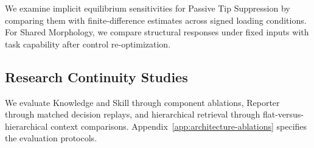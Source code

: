 We examine implicit equilibrium sensitivities for Passive Tip Suppression by comparing them with finite-difference estimates across signed loading conditions. For Shared Morphology, we compare structural responses under fixed inputs with task capability after control re-optimization.

\subsection{Research Continuity Studies}
\label{subsec:setup-continuity}

We evaluate Knowledge and Skill through component ablations, Reporter through matched decision replays, and hierarchical retrieval through flat-versus-hierarchical context comparisons. Appendix~\ref{app:architecture-ablations} specifies the evaluation protocols.
